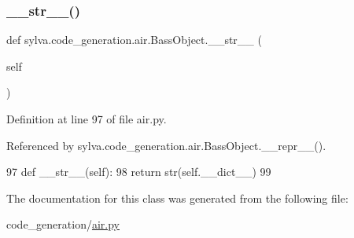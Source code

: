 \subsubsection{\texorpdfstring{\+\_\+\+\_\+str\+\_\+\+\_\+()}{\_\_str\_\_()}}
{\footnotesize\ttfamily def sylva.\+code\+\_\+generation.\+air.\+Bass\+Object.\+\_\+\+\_\+str\+\_\+\+\_\+ (\begin{DoxyParamCaption}\item[{}]{self }\end{DoxyParamCaption})}



Definition at line 97 of file air.\+py.



Referenced by sylva.\+code\+\_\+generation.\+air.\+Bass\+Object.\+\_\+\+\_\+repr\+\_\+\+\_\+().


\begin{DoxyCode}
97     \textcolor{keyword}{def }\_\_str\_\_(self):
98         \textcolor{keywordflow}{return} str(self.\_\_dict\_\_)
99 
\end{DoxyCode}


The documentation for this class was generated from the following file\+:\begin{DoxyCompactItemize}
\item 
code\+\_\+generation/\hyperlink{air_8py}{air.\+py}\end{DoxyCompactItemize}
